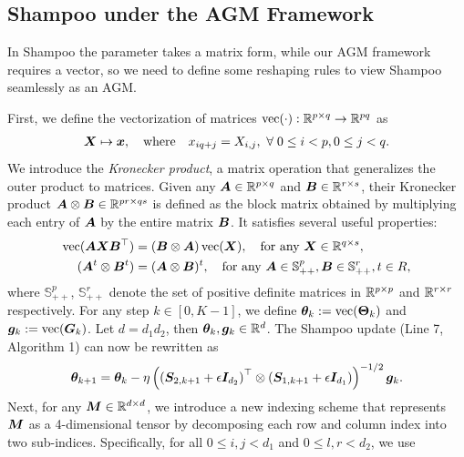 \subsection{Shampoo under the AGM Framework}

In Shampoo the parameter takes a matrix form, while our AGM framework requires a vector, so we need to define some reshaping rules to view Shampoo seamlessly as an AGM.  

First, we define the vectorization of matrices $\mathrm{vec}(\cdot): \mathbb{R}^{p \times q} \rightarrow \mathbb{R}^{pq}$ as
\begin{align*}
    \mX \mapsto \vx, \quad \text{where}\quad  x_{iq+j} = X_{i,j}, \ \forall\;0 \leq i < p, 0 \leq j < q. 
\end{align*}
We introduce the \emph{Kronecker product}, a matrix operation that generalizes the outer product to matrices.
Given any ${\bm{A}}\in\mathbb{R}^{p\times q}$ and ${\bm{B}}\in\mathbb{R}^{r\times s}$, their Kronecker product
${\bm{A}}\otimes{\bm{B}} \in \mathbb{R}^{pr\times qs}$ is defined as the block matrix obtained by multiplying each entry of ${\bm{A}}$ by the entire matrix ${\bm{B}}$. 
It satisfies several useful properties:
\begin{align}
    \mathrm{vec}({\bm{A}}{\bm{X}}{\bm{B}}^\top) &= ({\bm{B}} \otimes {\bm{A}})\,\mathrm{vec}({\bm{X}}), \quad \text{for any }{\bm{X}} \in \mathbb{R}^{q \times s}, \label{equ:kron-property-comb}\\
    ({\bm{A}}^t \otimes {\bm{B}}^t) &= ({\bm{A}} \otimes {\bm{B}})^t, \quad \text{for any ${\bm{A}} \in \mathbb{S}^{p}_{++},{\bm{B}} \in \mathbb{S}^{r}_{++},t \in R$,} \label{equ:kron-property-power}
\end{align}
where $\mathbb{S}^{p}_{++}$, $\mathbb{S}^{r}_{++}$ denote the set of positive definite matrices in $\mathbb{R}^{p \times p}$ and $\mathbb{R}^{r \times r}$ respectively. For any step $k \in [0, K-1]$, we define ${\bm{\theta}}_k:=\mathrm{vec}({\bm{\Theta}}_k)$ and ${\bm{g}}_k := \mathrm{vec}({\bm{G}}_k)$. Let $d = d_1 d_2$, then ${\bm{\theta}}_k, {\bm{g}}_k \in \mathbb{R}^d$. The Shampoo update (Line 7, Algorithm 1) can now be rewritten as
\begin{align}\label{equ:shampoo-update-rewritten}
    {\bm{\theta}}_{k+1} = {\bm{\theta}}_k - \eta \left(\left({\bm{S}}_{2,k+1}+\epsilon {\bm{I}}_{d_2}\right)^\top \otimes \left({\bm{S}}_{1,k+1}+\epsilon {\bm{I}}_{d_1}\right)\right)^{-1/2}{\bm{g}}_k.
\end{align}
Next, for any ${\bm{M}} \in \mathbb{R}^{d\times d}$, 
we introduce a new indexing scheme that represents ${\bm{M}}$ as a 4-dimensional tensor by decomposing each row and column index into two sub-indices. Specifically, for all $0 \le i,j < d_1$ and $ 0 \le l,r < d_2$, we use 
